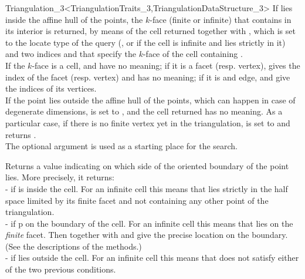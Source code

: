 \begin{ccRefClass}{Triangulation_3<TriangulationTraits_3,TriangulationDataStructure_3>}
{If  lies inside the affine hull of the points, the $k$-face
(finite or infinite) that contains  in its interior is
returned, by means of the cell returned together with , which
is set to the locate type of the query (, or  if the cell is infinite and 
lies strictly in it) and two indices  and  that
specify the $k$-face of the cell containing .\\ 
If the $k$-face is a cell,  and  have no
meaning; if it is a facet (resp. vertex),  gives the index of
the facet (resp. vertex) and  has no meaning; if it is and
edge,  and  give the indices of its vertices.\\ 
If the point  lies outside the affine hull of the points,
which can happen in case of degenerate dimensions,  is set to
, and the cell returned has no meaning.
As a particular case, if there is no finite vertex yet in the
triangulation,  is set to  and
 returns . \\
The optional argument  is used as a starting place for the search.
}

{Returns a value indicating on which side of the oriented boundary
of  the point  lies. More precisely, it returns:\\
-  if  is inside the cell. For an infinite
cell this means that  lies strictly in the half space limited by
its finite facet and not containing any other point of the triangulation. \\
-  if p on the boundary of the cell. For an infinite
cell this means that  lies on the \textit{finite} facet. Then
 together with  and  give the precise location
on the boundary. (See the descriptions of the  methods.)\\ 
-  if  lies outside the cell. For an
infinite cell this means that  does not satisfy either of the
two previous conditions.  
}


\end{ccRefClass}
